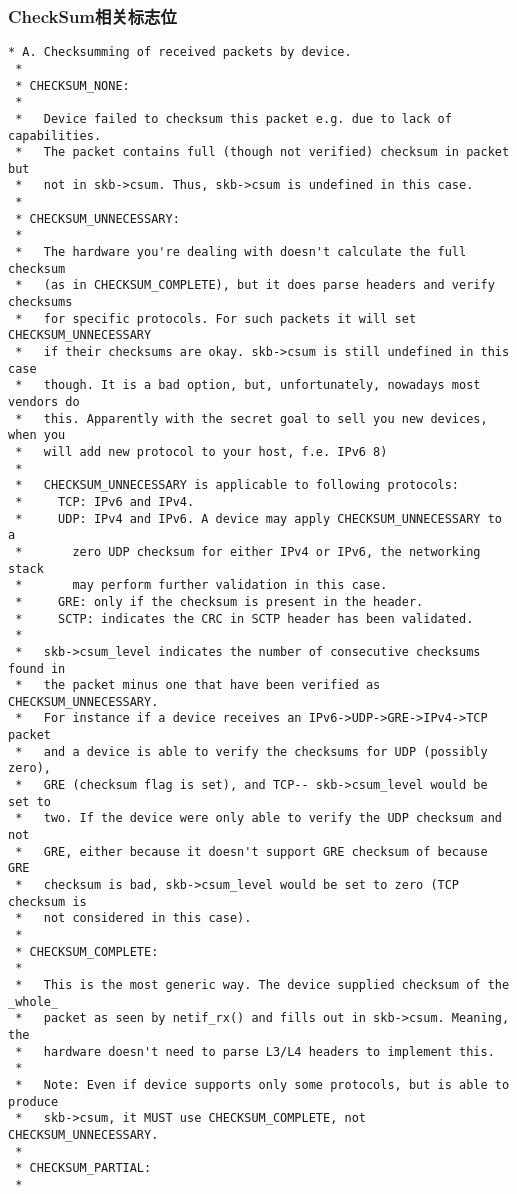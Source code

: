             \subsubsection{CheckSum相关标志位}
\begin{verbatim}
* A. Checksumming of received packets by device.
 *
 * CHECKSUM_NONE:
 *
 *   Device failed to checksum this packet e.g. due to lack of capabilities.
 *   The packet contains full (though not verified) checksum in packet but
 *   not in skb->csum. Thus, skb->csum is undefined in this case.
 *
 * CHECKSUM_UNNECESSARY:
 *
 *   The hardware you're dealing with doesn't calculate the full checksum
 *   (as in CHECKSUM_COMPLETE), but it does parse headers and verify checksums
 *   for specific protocols. For such packets it will set CHECKSUM_UNNECESSARY
 *   if their checksums are okay. skb->csum is still undefined in this case
 *   though. It is a bad option, but, unfortunately, nowadays most vendors do
 *   this. Apparently with the secret goal to sell you new devices, when you
 *   will add new protocol to your host, f.e. IPv6 8)
 *
 *   CHECKSUM_UNNECESSARY is applicable to following protocols:
 *     TCP: IPv6 and IPv4.
 *     UDP: IPv4 and IPv6. A device may apply CHECKSUM_UNNECESSARY to a
 *       zero UDP checksum for either IPv4 or IPv6, the networking stack
 *       may perform further validation in this case.
 *     GRE: only if the checksum is present in the header.
 *     SCTP: indicates the CRC in SCTP header has been validated.
 *
 *   skb->csum_level indicates the number of consecutive checksums found in
 *   the packet minus one that have been verified as CHECKSUM_UNNECESSARY.
 *   For instance if a device receives an IPv6->UDP->GRE->IPv4->TCP packet
 *   and a device is able to verify the checksums for UDP (possibly zero),
 *   GRE (checksum flag is set), and TCP-- skb->csum_level would be set to
 *   two. If the device were only able to verify the UDP checksum and not
 *   GRE, either because it doesn't support GRE checksum of because GRE
 *   checksum is bad, skb->csum_level would be set to zero (TCP checksum is
 *   not considered in this case).
 *
 * CHECKSUM_COMPLETE:
 *
 *   This is the most generic way. The device supplied checksum of the _whole_
 *   packet as seen by netif_rx() and fills out in skb->csum. Meaning, the
 *   hardware doesn't need to parse L3/L4 headers to implement this.
 *
 *   Note: Even if device supports only some protocols, but is able to produce
 *   skb->csum, it MUST use CHECKSUM_COMPLETE, not CHECKSUM_UNNECESSARY.
 *
 * CHECKSUM_PARTIAL:
 *

\end{verbatim}
